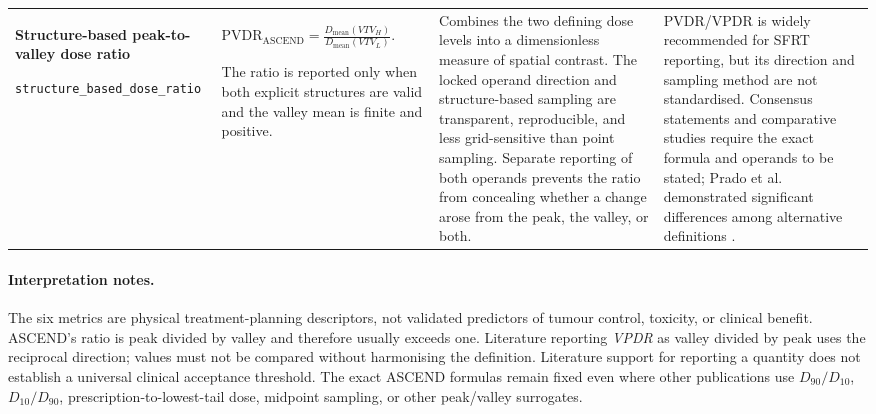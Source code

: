 \documentclass[10pt,a4paper]{article}
\newcommand{\Dmean}{D_{\mathrm{mean}}}
\begin{document}
\begin{longtable}{L{2.5cm} L{4.0cm} L{5.2cm} L{3.4cm}}
\textbf{Structure-based peak-to-valley dose ratio}\par\smallskip
\texttt{structure\_based\_dose\_ratio} &
$\displaystyle \mathrm{PVDR}_{\mathrm{ASCEND}}=\frac{\Dmean(VTV_H)}{\Dmean(VTV_L)}.$

The ratio is reported only when both explicit structures are valid and the valley mean is finite and positive. &
Combines the two defining dose levels into a dimensionless measure of spatial contrast. The locked operand direction and structure-based sampling are transparent, reproducible, and less grid-sensitive than point sampling. Separate reporting of both operands prevents the ratio from concealing whether a change arose from the peak, the valley, or both. &
PVDR/VPDR is widely recommended for SFRT reporting, but its direction and sampling method are not standardised. Consensus statements and comparative studies require the exact formula and operands to be stated; Prado et al. demonstrated significant differences among alternative definitions \cite{Zhang2020GRID,Li2024,Prado2024}. \\

\end{longtable}
\normalsize

\paragraph{Interpretation notes.}
The six metrics are physical treatment-planning descriptors, not validated predictors of tumour control, toxicity, or clinical benefit. ASCEND's ratio is peak divided by valley and therefore usually exceeds one. Literature reporting \emph{VPDR} as valley divided by peak uses the reciprocal direction; values must not be compared without harmonising the definition. Literature support for reporting a quantity does not establish a universal clinical acceptance threshold. The exact ASCEND formulas remain fixed even where other publications use $D_{90}/D_{10}$, $D_{10}/D_{90}$, prescription-to-lowest-tail dose, midpoint sampling, or other peak/valley surrogates.



\end{document}
